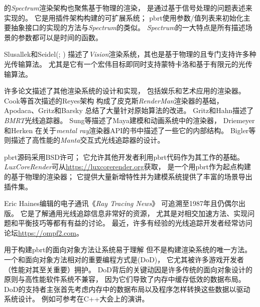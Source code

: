 \citet{glassner1993spectrum}的\emph{Spectrum}渲染架构也聚焦基于物理的渲染，
是通过基于信号处理的问题表述来实现的。
它是用插件架构构建的可扩展系统；
pbrt使用参数/值列表来初始化主要抽象接口的实现的方法与\emph{Spectrum}的类似。
\emph{Spectrum}的一大特点是所有描述场景的参数都可以是时间的函数。

Slusallek和Seidel(\cite*{468387,10.1007/978-3-7091-7484-5_6}; \citealt{slusallek1996vision})
描述了\emph{Vision}渲染系统，其也是基于物理的且专门支持许多种光传输算法。
尤其是它有一个宏伟目标即同时支持蒙特卡洛和基于有限元的光传输算法。

许多论文描述了其他渲染系统的设计和实现，
包括娱乐和艺术应用的渲染器。
Cook等\parencite*{10.1145/37401.37414}首次描述的Reyes架构
构成了皮克斯\emph{RenderMan}渲染器的基础，
Apodaca、Gritz和Barsky\parencite*{10.5555/555371}
总结了大量针对原始算法的改进。
Gritz和Hahn\parencite*{doi:10.1080/10867651.1996.10487462}描述了\emph{BMRT}光线追踪器。
Sung等\parencite*{732097}描述了Maya建模和动画系统中的渲染器，
Driemeyer和Herken\parencite*{10.5555/863712}
在关于\emph{mental ray}渲染器API的书中描述了一些它的内部结构。
Bigler等\parencite*{4061561}则描述了高性能的\emph{Manta}交互式光线追踪器的设计。

pbrt源码采用BSD许可；
它允许其他开发者利用pbrt代码作为其工作的基础。
\emph{LuxCoreRender}可从\url{https://luxcorerender.org}获取，
是一个用pbrt作为起点构建的基于物理的渲染器；
它提供大量新增特性并为建模系统提供了丰富的场景导出插件集。

Eric Haines编辑的电子通讯《\emph{Ray Tracing News}》
可追溯至1987年且仍偶尔出版。
它是了解通用光线追踪信息非常好的资源，
尤其是对相交加速方法、实现问题和平衡技巧等都有有益的讨论。
最近，许多有经验的光线追踪开发者经常访问论坛\url{https://ompf2.com}。

用于构建pbrt的面向对象方法让系统易于理解
但不是构建渲染系统的唯一方法。
一个和面向对象方法相对的重要编程方式是(DoD)，
它尤其被许多游戏开发者（性能对其至关重要）拥护。
DoD背后的关键动因是许多传统的面向对象设计的原则与高性能软件系统不兼容，
因为它们导致了内存中缓存低效的数据布局。
DoD的支持者主张首先考虑内存中的数据布局以及程序怎样转换这些数据以驱动系统设计。
例如可参考\citet{acton_2014}在C++大会上的演讲。
